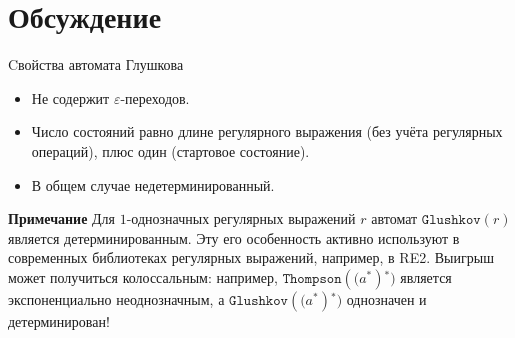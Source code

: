 \documentclass[mathserif]{beamer}
\def\Glushkov{\mathtt{Glushkov}}
\def\Thompson{\mathtt{Thompson}}
\def\star{\ensuremath{^{*}}}%
\def\regexpstr#1{\mathtt{#1}}%
\newcommand{\empt}{\varepsilon} %
\begin{document}
\section{Обсуждение}
\begin{frame}{Cвойства автомата Глушкова}
    \begin{itemize}
        \item Не содержит $\empt$-переходов.
        \item Число состояний равно длине регулярного выражения (без учёта регулярных операций), плюс один (стартовое состояние).
        \item В общем случае недетерминированный.
    \end{itemize}

    \begin{alertblock}{\bf Примечание}
        Для $1$-однозначных регулярных выражений $r$ автомат $\Glushkov(r)$ является детерминированным. Эту его особенность активно используют в современных библиотеках регулярных выражений, например, в \textsc{RE2}. Выигрыш может получиться колоссальным: например, $\Thompson(\regexpstr(a\star)\star)$ является экспоненциально неоднозначным, а $\Glushkov(\regexpstr(a\star)\star)$ однозначен и детерминирован!
    \end{alertblock}%
\end{frame}
\end{document}
